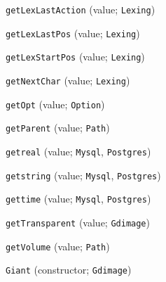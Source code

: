 \begin{description}
\item[] \verb"getLexLastAction" (value; \verb"Lexing")
\item[] \verb"getLexLastPos" (value; \verb"Lexing")
\item[] \verb"getLexStartPos" (value; \verb"Lexing")
\item[] \verb"getNextChar" (value; \verb"Lexing")
\item[] \verb"getOpt" (value; \verb"Option")
\item[] \verb"getParent" (value; \verb"Path")
\item[] \verb"getreal" (value; \verb"Mysql", \verb"Postgres")
\item[] \verb"getstring" (value; \verb"Mysql", \verb"Postgres")
\item[] \verb"gettime" (value; \verb"Mysql", \verb"Postgres")
\item[] \verb"getTransparent" (value; \verb"Gdimage")
\item[] \verb"getVolume" (value; \verb"Path")
\item[] \verb"Giant" (constructor; \verb"Gdimage")
\\[2ex]


\end{description}
